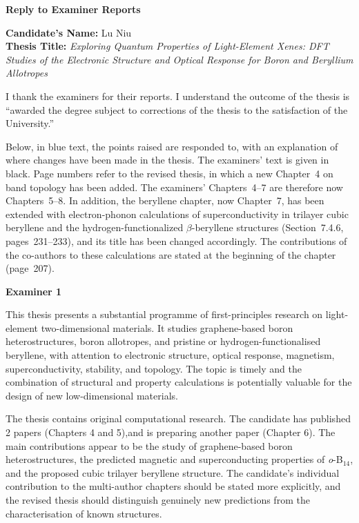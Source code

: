\documentclass[12pt,a4paper]{article}
\begin{document}
\textbf{Reply to Examiner Reports}

\textbf{Candidate's Name:} Lu Niu\\
\textbf{Thesis Title:} \textit{Exploring Quantum Properties of Light-Element Xenes: DFT Studies of the Electronic Structure and Optical Response for Boron and Beryllium Allotropes}

I thank the examiners for their reports.
I understand the outcome of the thesis is ``awarded the degree subject to corrections of the thesis to the satisfaction of the University.''

Below, in blue text, the points raised are responded to, with an explanation of where changes have been made in the thesis.
The examiners' text is given in black.
Page numbers refer to the revised thesis, in which a new Chapter~4 on band topology has been added.
The examiners' Chapters~4--7 are therefore now Chapters~5--8.
In addition, the beryllene chapter, now Chapter~7, has been extended with electron-phonon calculations of superconductivity in trilayer cubic beryllene and the hydrogen-functionalized $\beta$-beryllene structures (Section~7.4.6, pages~231--233), and its title has been changed accordingly.
The contributions of the co-authors to these calculations are stated at the beginning of the chapter (page~207).

\bigskip
\textbf{Examiner 1}

This thesis presents a substantial programme of first-principles research on light-element two-dimensional materials. It studies graphene-based boron heterostructures, boron allotropes, and pristine or hydrogen-functionalised beryllene, with attention to electronic structure, optical response, magnetism, superconductivity, stability, and topology. The topic is timely and the combination of structural and property calculations is potentially valuable for the design of new low-dimensional materials.

The thesis contains original computational research. The candidate has published 2 papers (Chapters 4 and 5),and is preparing another paper (Chapter 6). The main contributions appear to be the study of graphene-based boron heterostructures, the predicted magnetic and superconducting properties of \textit{o}-B$_{14}$, and the proposed cubic trilayer beryllene structure. The candidate's individual contribution to the multi-author chapters should be stated more explicitly, and the revised thesis should distinguish genuinely new predictions from the characterisation of known structures.
\end{document}
